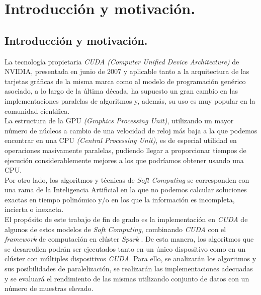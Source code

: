 \documentclass[a4paper,oneside,11pt,titlepage]{book}
\begin{document}

  
\frontmatter
\tableofcontents
\listoffigures
\listoftables

%
\mainmatter
\setlength{\parskip}{5pt}
\chapter{Introducción y motivación.}
\section{Introducción y motivación.}

La tecnología propietaria \textit{CUDA (Computer Unified Device Architecture)} \cite{cuda} de NVIDIA, presentada en junio de 2007 y aplicable tanto a la arquitectura de las tarjetas gráficas de la misma marca como al modelo de programación genérico asociado, a lo largo de la última década, ha supuesto un gran cambio en las implementaciones paralelas de algoritmos y, además, su uso es muy popular en la comunidad científica.\\

La estructura de la GPU \textit{(Graphics Processing Unit)}, utilizando un mayor número de núcleos a cambio de una velocidad de reloj más baja a la que podemos encontrar en una CPU \textit{(Central Processing Unit)}, es de especial utilidad en operaciones masivamente paralelas, pudiendo llegar a proporcionar tiempos de ejecución considerablemente mejores a los que podríamos obtener usando una CPU.\\

Por otro lado, los algoritmos y técnicas de \textit{Soft Computing} se corresponden con una rama de la Inteligencia Artificial en la que no podemos calcular soluciones exactas en tiempo polinómico y/o en los que la información es incompleta, incierta o inexacta.\\

El propósito de este trabajo de fin de grado es la implementación en \textit{CUDA} de algunos de estos modelos de \textit{Soft Computing}, combinando \textit{CUDA} con el \textit{framework} de computación en clúster \textit{Spark} \cite{spark}. De esta manera, los algoritmos que se desarrollen podrán ser ejecutados tanto en un único dispositivo como en un clúster con múltiples dispositivos \textit{CUDA}. Para ello, se analizarán los algoritmos y sus posibilidades de paralelización, se realizarán las implementaciones adecuadas y se evaluará el rendimiento de las mismas utilizando conjunto de datos con un número de muestras elevado.\\
\end{document}
